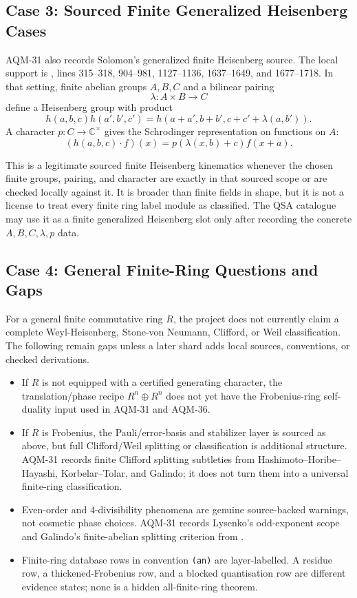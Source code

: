 \subsection{Case 3: Sourced Finite Generalized Heisenberg Cases}

AQM-31 also records Solomon's generalized finite Heisenberg source.  The
local support is
,
lines 315--318, 904--981, 1127--1136, 1637--1649, and 1677--1718.  In that
setting, finite abelian groups \(A,B,C\) and a bilinear pairing
\[
  \lambda:A\times B\to C
\]
define a Heisenberg group with product
\[
  h(a,b,c)h(a',b',c')
  =
  h(a+a',b+b',c+c'+\lambda(a,b')).
\]
A character \(p:C\to\mathbb C^\times\) gives the Schrodinger representation
on functions on \(A\):
\[
  (h(a,b,c)\cdot f)(x)=p(\lambda(x,b)+c)f(x+a).
\]

This is a legitimate sourced finite Heisenberg kinematics whenever the
chosen finite groups, pairing, and character are exactly in that sourced
scope or are checked locally against it.  It is broader than finite fields in
shape, but it is not a license to treat every finite ring label module as
classified.  The QSA catalogue may use it as a finite generalized
Heisenberg slot only after recording the concrete \(A,B,C,\lambda,p\) data.

\subsection{Case 4: General Finite-Ring Questions and Gaps}

For a general finite commutative ring \(R\), the project does not currently
claim a complete Weyl-Heisenberg, Stone-von Neumann, Clifford, or Weil
classification.  The following remain gaps unless a later shard adds local
sources, conventions, or checked derivations.

\begin{itemize}
\item If \(R\) is not equipped with a certified generating character, the
translation/phase recipe \(R^n\oplus R^n\) does not yet have the
Frobenius-ring self-duality input used in AQM-31 and AQM-36.
\item If \(R\) is Frobenius, the Pauli/error-basis and stabilizer layer is
sourced as above, but full Clifford/Weil splitting or classification is
additional structure.  AQM-31 records finite Clifford splitting subtleties
from Hashimoto--Horibe--Hayashi, Korbelar--Tolar, and Galindo; it does not
turn them into a universal finite-ring classification.
\item Even-order and \(4\)-divisibility phenomena are genuine source-backed
warnings, not cosmetic phase choices.  AQM-31 records Lysenko's odd-exponent
scope and Galindo's finite-abelian splitting criterion from
.
\item Finite-ring database rows in convention \texttt{(an)} are
layer-labelled.  A residue row, a thickened-Frobenius row, and a blocked
quantisation row are different evidence states; none is a hidden
all-finite-ring theorem.
\end{itemize}

